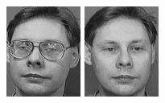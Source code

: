 \begin{figure}[ht]
 \includegraphics[width=\columnwidth/11]{ch3/figures/s4_3.png}
 \includegraphics[width=\columnwidth/11]{ch3/figures/s4_4.png}

\end{figure}
